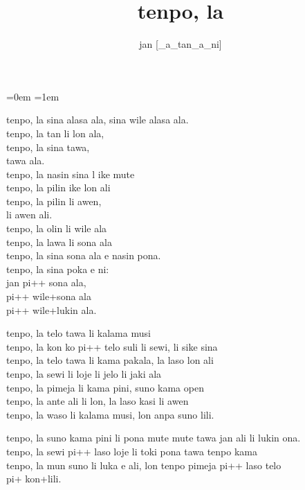 \documentclass{article}
\title{tenpo, la}
\author{jan {[}\_a\_tan\_a\_ni{]}}
\date{}
\begin{document}
    \parindent=0em
    \parskip=1em
    \large

    \maketitle
    tenpo, la sina alasa ala, sina wile alasa ala. \\
    tenpo, la tan li lon ala, \\
    tenpo, la sina tawa, \\
    tawa ala. \\

    tenpo, la nasin sina l ike mute \\
    tenpo, la pilin ike lon ali \\
    tenpo, la pilin li awen, \\
    li awen ali. \\

    tenpo, la olin li wile ala \\
    tenpo, la lawa li sona ala \\
    tenpo, la sina sona ala e nasin pona. \\

    tenpo, la sina poka e ni: \\
    jan pi++ sona ala, \\
    pi++ wile+sona ala \\
    pi++ wile+lukin ala. \\

    \bigskip

    tenpo, la telo tawa li kalama musi \\
    tenpo, la kon ko pi++ telo suli li sewi, li sike sina \\
    tenpo, la telo tawa li kama pakala, la laso lon ali \\

    tenpo, la sewi li loje li jelo li jaki ala \\
    tenpo, la pimeja li kama pini, suno kama open \\
    tenpo, la ante ali li lon, la laso kasi li awen \\
    tenpo, la waso li kalama musi, lon anpa suno lili.

    tenpo, la suno kama pini li pona mute mute tawa jan ali li lukin ona. \\
    tenpo, la sewi pi++ laso loje li toki pona tawa tenpo kama \\
    tenpo, la mun suno li luka e ali, lon tenpo pimeja pi++ laso telo \\
    pi+ kon+lili.
\end{document}

